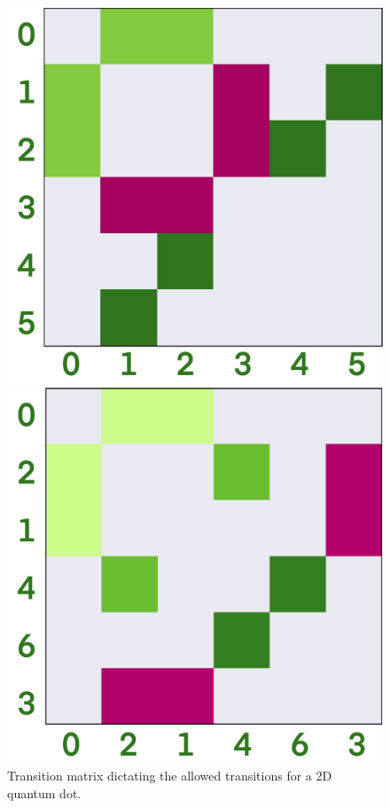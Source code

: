 \begin{figure}
    \begin{center}
    \begin{minipage}{0.49\textwidth}
        \centering
        \includegraphics[width=\textwidth]{results/figures/dipole_no_b.png}
        \caption{Transition matrix dictating the allowed transitions for a
            2D quantum dot.}
        \label{fig:transition_no_b}
    \end{minipage}
    \begin{minipage}{0.49\textwidth}
        \includegraphics[width=\textwidth]{results/figures/dipole_yes_b.png}

\end{minipage}
\end{center}
\end{figure}
